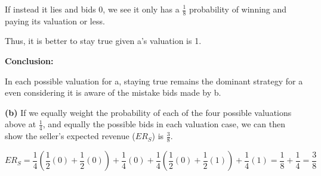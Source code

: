 \documentclass[twoside]{article}
\begin{document}
If instead it lies and bids 0, we see it only has a $\frac{1}{8}$ probability of winning and paying its valuation or less.

Thus, it is better to stay true given a's valuation is 1.

{\bf Conclusion:}

In each possible valuation for a, staying true remains the dominant strategy for a even considering it is aware of the mistake bids made by b.

\vspace{10mm}
{\bf(b)} If we equally weight the probability of each of the four possible valuations above at $\frac{1}{4}$, and equally the possible bids in each valuation case, we can then show the seller's expected revenue ($ER_{S}$) is $\frac{3}{8}$.

$$ER_{S} = \frac{1}{4}(\frac{1}{2}(0) + \frac{1}{2}(0)) + \frac{1}{4}(0) + \frac{1}{4}(\frac{1}{2}(0) + \frac{1}{2}(1)) + \frac{1}{4}(1) = \frac{1}{8} + \frac{1}{4} =  \frac{3}{8}$$
\end{document}
